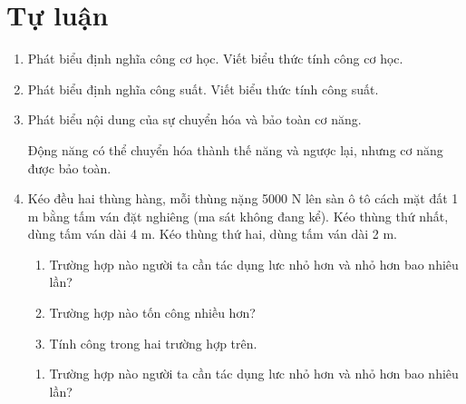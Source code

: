 \section{Tự luận}
\begin{enumerate}[label=\bfseries Câu \arabic*:]
	\item {}
	
	{
		Phát biểu định nghĩa công cơ học. Viết biểu thức tính công cơ học.
	}
	
	
	\item {}
	
	{Phát biểu định nghĩa công suất. Viết biểu thức tính công suất.}
	
	\item {}
	
	
	{Phát biểu nội dung của sự chuyển hóa và bảo toàn cơ năng.
	}
	
	\hideall
	{Động năng có thể chuyển hóa thành thế năng và ngược lại, nhưng cơ năng được bảo toàn.
	}
	\item {}
	
	
	{Kéo đều hai thùng hàng, mỗi thùng nặng 5000 N lên sàn ô tô cách mặt đất 1 m bằng tấm ván đặt nghiêng (ma sát không đang kể). Kéo thùng thứ nhất, dùng tấm ván dài 4 m. Kéo thùng thứ hai, dùng tấm ván dài 2 m.
		\begin{enumerate}
			\item Trường hợp nào người ta cần tác dụng lưc nhỏ hơn và nhỏ hơn bao nhiêu lần?
			\item Trường hợp nào tốn công nhiều hơn?
			\item Tính công trong hai trường hợp trên.
		\end{enumerate}
	}
	
	\hideall
	{		\begin{enumerate}
			\item Trường hợp nào người ta cần tác dụng lưc nhỏ hơn và nhỏ hơn bao nhiêu lần?
			

\end{enumerate}}
\end{enumerate}
